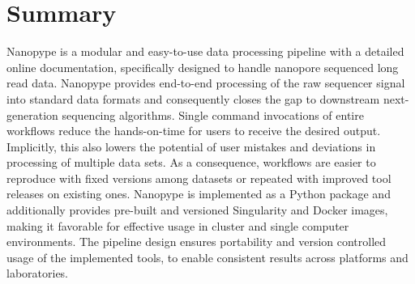 \section{Summary}
\label{sec:nanopype:summary}
Nanopype is a modular and easy-to-use data processing pipeline with a detailed online documentation, specifically designed to handle nanopore sequenced long read data.
Nanopype provides end-to-end processing of the raw sequencer signal into standard data formats and consequently closes the gap to downstream next-generation sequencing algorithms. Single command invocations of entire workflows reduce the hands-on-time for users to receive the desired output. Implicitly, this also lowers the potential of user mistakes and deviations in processing of multiple data sets. As a consequence, workflows are easier to reproduce with fixed versions among datasets or repeated with improved tool releases on existing ones.
Nanopype is implemented as a Python package and additionally provides pre-built and versioned Singularity and Docker images, making it favorable for effective usage in cluster and single computer environments. The pipeline design ensures portability and version controlled usage of the implemented tools, to enable consistent results across platforms and laboratories.


